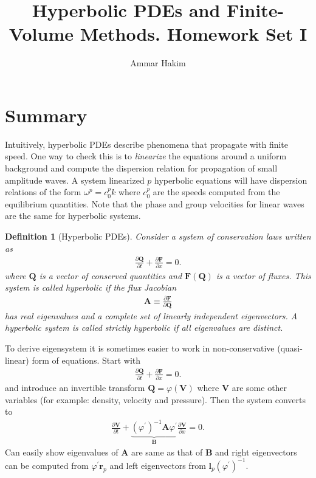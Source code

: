 \documentclass[11pt]{article}
\title{Hyperbolic PDEs and Finite-Volume Methods. Homework Set I}%
\author{Ammar Hakim}%
\date{}%
\newtheorem{definition}{Definition}
\newcommand{\pfrac}[2]{\frac{\partial #1}{\partial #2}}
\newcommand{\mvec}[1]{\mathbf{#1}}
\begin{document}
\maketitle

\section*{Summary}

Intuitively, hyperbolic PDEs describe phenomena that propagate with
finite speed. One way to check this is to \emph{linearize} the
equations around a uniform background and compute the dispersion
relation for propagation of small amplitude waves. A system linearized
$p$ hyperbolic equations will have dispersion relations of the form
$\omega^p = c_0^p k$ where $c_0^p$ are the speeds computed from the
equilibrium quantities. Note that the phase and group velocities for
linear waves are the same for hyperbolic systems.

\begin{definition}[Hyperbolic PDEs]
  Consider a system of conservation laws written as
  \begin{align}
    \pfrac{\mvec{Q}}{t} + \pfrac{\mvec{F}}{x} = 0. \label{eq:hyp-law}
  \end{align}
  where $\mvec{Q}$ is a vector of conserved quantities and
  $\mvec{F}(\mvec{Q})$ is a vector of fluxes. This system is called
  \emph{hyperbolic} if the flux Jacobian
  \begin{align*}
    \mvec{A} \equiv \pfrac{\mvec{F}}{\mvec{Q}}
  \end{align*}
  has \emph{real eigenvalues} and a \emph{complete set of linearly
    independent} eigenvectors. A hyperbolic system is called
  \emph{strictly hyperbolic} if all eigenvalues are distinct.
\end{definition}

To derive eigensystem it is sometimes easier to work in
non-conservative (quasi-linear) form of equations. Start with
\begin{align*}
  \pfrac{\mvec{Q}}{t} + \pfrac{\mvec{F}}{x} = 0.
\end{align*}
and introduce an invertible transform $\mvec{Q} = \varphi(\mvec{V})$
where $\mvec{V}$ are some other variables (for example: density,
velocity and pressure). Then the system converts to
\begin{align*}
  \pfrac{\mvec{V}}{t} +
  \underbrace{(\varphi^{\prime})^{-1} \mvec{A}\varphi^{\prime}}_{\mvec{B}}
  \pfrac{\mvec{V}}{x} = 0.
\end{align*}
Can easily show eigenvalues of $\mvec{A}$ are same as that of
$\mvec{B}$ and right eigenvectors can be computed from
$\varphi^{\prime} \mvec{r}_p$ and left eigenvectors from
$\mvec{l}_p (\varphi^{\prime})^{-1}$.
\end{document}
